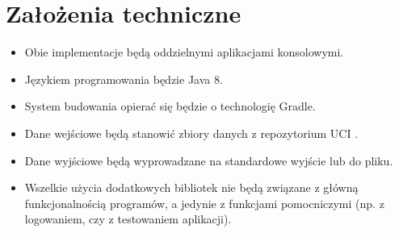 \section{Założenia techniczne}

\begin{itemize}
  \item Obie implementacje będą oddzielnymi aplikacjami konsolowymi.
  \item Językiem programowania będzie Java 8.
  \item System budowania opierać się będzie o technologię Gradle.
  \item Dane wejściowe będą stanowić zbiory danych z repozytorium UCI \cite{UCI}.
  \item Dane wyjściowe będą wyprowadzane na standardowe wyjście lub do pliku.
  \item Wszelkie użycia dodatkowych bibliotek nie będą związane z główną funkcjonalnością programów, a jedynie z funkcjami pomocniczymi (np. z logowaniem, czy z testowaniem aplikacji).
\end{itemize}
